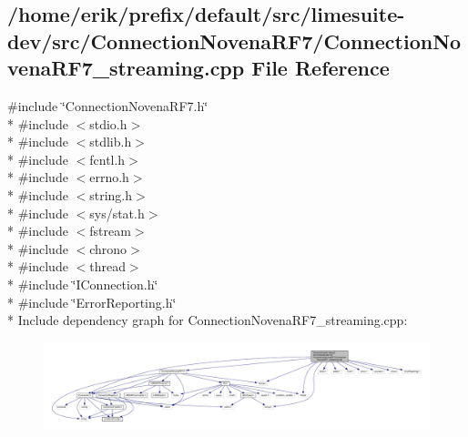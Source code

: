 \subsection{/home/erik/prefix/default/src/limesuite-\/dev/src/\+Connection\+Novena\+R\+F7/\+Connection\+Novena\+R\+F7\+\_\+streaming.cpp File Reference}
\label{ConnectionNovenaRF7__streaming_8cpp}
{\ttfamily \#include \char`\"{}Connection\+Novena\+R\+F7.\+h\char`\"{}}\\*
{\ttfamily \#include $<$stdio.\+h$>$}\\*
{\ttfamily \#include $<$stdlib.\+h$>$}\\*
{\ttfamily \#include $<$fcntl.\+h$>$}\\*
{\ttfamily \#include $<$errno.\+h$>$}\\*
{\ttfamily \#include $<$string.\+h$>$}\\*
{\ttfamily \#include $<$sys/stat.\+h$>$}\\*
{\ttfamily \#include $<$fstream$>$}\\*
{\ttfamily \#include $<$chrono$>$}\\*
{\ttfamily \#include $<$thread$>$}\\*
{\ttfamily \#include \char`\"{}I\+Connection.\+h\char`\"{}}\\*
{\ttfamily \#include \char`\"{}Error\+Reporting.\+h\char`\"{}}\\*
Include dependency graph for Connection\+Novena\+R\+F7\+\_\+streaming.\+cpp\+:
\nopagebreak
\begin{figure}[H]
\begin{center}
\leavevmode
\includegraphics[width=350pt]{df/d26/ConnectionNovenaRF7__streaming_8cpp__incl}
\end{center}
\end{figure}

